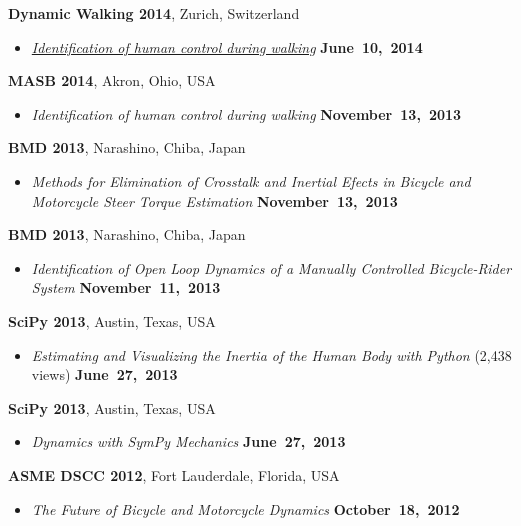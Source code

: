 \documentclass[10pt]{article}
\newenvironment{outerlist}[1][\enskip\textbullet]%
        {\begin{itemize}[#1]}{\end{itemize}%
         \vspace{-.6\baselineskip}}
\newcommand{\blankline}{\quad\pagebreak[2]}
\begin{document}
\blankline

\textbf{Dynamic Walking 2014}, Zurich, Switzerland
\begin{outerlist}
\item[]
  \href{http://www.moorepants.info/presentations/2014/DW2014}{\textit{Identification
  of human control during walking}}
    \hfill \textbf{June~10,~2014}
\end{outerlist}

\blankline

\textbf{MASB 2014}, Akron, Ohio, USA
\begin{outerlist}
\item[] \textit{Identification of human control during walking}
    \hfill \textbf{November~13,~2013}
\end{outerlist}

\blankline

\textbf{BMD 2013}, Narashino, Chiba, Japan
\begin{outerlist}
  \item[] \textit{Methods for Elimination of Crosstalk and Inertial Efects in
    Bicycle and Motorcycle Steer Torque Estimation}
    \hfill \textbf{November~13,~2013}
\end{outerlist}

\blankline

\textbf{BMD 2013}, Narashino, Chiba, Japan
\begin{outerlist}
  \item[] \textit{Identification of Open Loop Dynamics of a Manually Controlled
    Bicycle-Rider System}
    \hfill \textbf{November~11,~2013}
\end{outerlist}

\blankline

\textbf{SciPy 2013}, Austin, Texas, USA
\begin{outerlist}
  \item[] \textit{Estimating and Visualizing the Inertia of the Human Body with
    Python} (2,438 views)
    \hfill \textbf{June~27,~2013}
\end{outerlist}

\blankline

\textbf{SciPy 2013}, Austin, Texas, USA
\begin{outerlist}
  \item[] \textit{Dynamics with SymPy Mechanics}
    \hfill \textbf{June~27,~2013}
\end{outerlist}

\blankline

\textbf{ASME DSCC 2012}, Fort Lauderdale, Florida, USA
\begin{outerlist}
  \item[] \textit{The Future of Bicycle and Motorcycle Dynamics}
    \hfill \textbf{October~18,~2012}
\end{outerlist}
\end{document}
